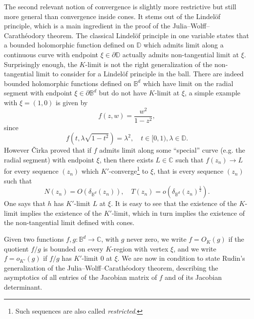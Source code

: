 \documentclass[11pt, reqno]{amsart}
\numberwithin{equation}{section}
\theoremstyle{definition}
\newcommand{\C}{\mathbb{C}}
\newcommand{\D}{\mathbb{D}}
\newcommand{\B}{\mathbb{B}}
\begin{document}
	
	The second relevant notion of convergence is slightly more restrictive but still more general than convergence inside cones. It stems out of the Lindel\"of principle, which is a main ingredient in the proof of the Julia--Wolff--Carath\'eodory theorem. The classical Lindel\"of principle in one variable states that a bounded holomorphic function   defined on $\D$ which admits limit along a continuous curve with endpoint $\xi\in \partial \D$ actually admits non-tangential limit at $\xi$.
	Surprisingly enough, the $K$-limit is not the right generalization of the non-tangential limit to consider for a Lindel\"of principle in the ball. There are indeed bounded holomorphic functions defined on $\B^d$ which have limit on the radial segment with endpoint $\xi\in \partial \B^d$ but do not have $K$-limit at $\xi$, a simple example with $\xi=(1,0)$ is given by
	\begin{equation}\label{rudinexample}
		f(z,w)=\frac{w^2}{1-z^2},
	\end{equation}
	since $$f(t,\lambda\sqrt{1-t^2})=\lambda^2,\quad t\in [0,1),\lambda\in \D.$$
	However \v{C}irka \cite{cirka} proved that if $f$ admits limit along some ``special'' curve (e.g. the radial segment) with endpoint $\xi$, then
	there exists $L\in \C$ such that
	$f(z_n)\to L$ for every sequence  $(z_n)$ which $K'$-converge\footnote{Such sequences are also called {\sl restricted}.} to $\xi$, that is every sequence $(z_n)$ such that
	\begin{equation}\label{cf2}
		N(z_n)=O(\delta_{\B^d}(z_n)),\quad T(z_n)=o(\delta_{\B^d}(z_n)^{\frac{1}{2}}).
	\end{equation}
	One  says that $h$ has  $K'$-limit $L$ at $\xi$.
	It is easy to see that the existence of the $K$-limit implies the existence of the $K'$-limit, which in turn implies the existence of the  non-tangential limit defined with cones.
	
	
	
	Given two functions $f,g\colon \B^d\to \C$, with $g$ never zero, we write 
	$f=O_K(g)$  if the quotient $f/g$ is bounded on every $K$-region with vertex $\xi$, and we write $f=o_{K'}(g)$ if  $f/g$ has
	$K'$-limit 0 at $\xi$. We are now in condition to state Rudin's generalization of the Julia--Wolff--Carath\'eodory theorem, describing the asymptotics of all entries of the Jacobian matrix of $f$ and of its Jacobian determinant.
	
\end{document}
